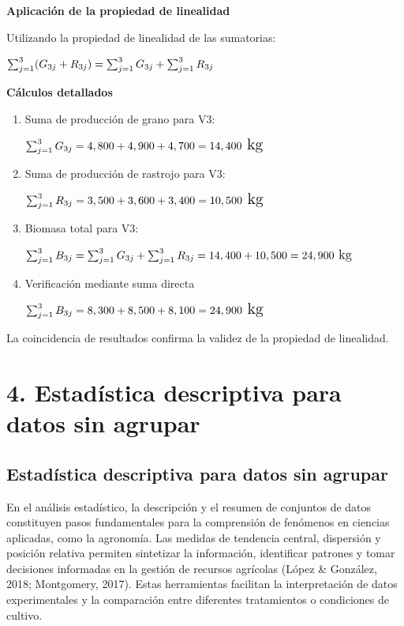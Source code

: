\documentclass[
  spanish,
  letterpaper,
]{book}
\begin{document}
\textbf{Aplicación de la propiedad de linealidad}

Utilizando la propiedad de linealidad de las sumatorias:

\(\Large \sum_{j=1}^{3} (G_{3j} + R_{3j}) = \sum_{j=1}^{3} G_{3j} + \sum_{j=1}^{3} R_{3j}\)

\textbf{Cálculos detallados}

\begin{enumerate}
\def\labelenumi{\arabic{enumi}.}
\item
  Suma de producción de grano para V3:

  \(\Large \sum_{j=1}^{3} G_{3j} = 4,800 + 4,900 + 4,700 = 14,400 \text{ kg}\)
\item
  Suma de producción de rastrojo para V3:

  \(\Large \sum_{j=1}^{3} R_{3j} = 3,500 + 3,600 + 3,400 = 10,500 \text{ kg}\)
\item
  Biomasa total para V3:

  \(\large \sum_{j=1}^{3} B_{3j} = \sum_{j=1}^{3} G_{3j} + \sum_{j=1}^{3} R_{3j} = 14,400 + 10,500 = 24,900 \text{ kg}\)
\item
  Verificación mediante suma directa

  \(\Large \sum_{j=1}^{3} B_{3j} = 8,300 + 8,500 + 8,100 = 24,900 \text{ kg}\)
\end{enumerate}

La coincidencia de resultados confirma la validez de la propiedad de
linealidad.

\part{4. Estadística descriptiva para datos sin agrupar}


\chapter{Estadística descriptiva para datos sin
agrupar}\label{estaduxedstica-descriptiva-para-datos-sin-agrupar-1}

En el análisis estadístico, la descripción y el resumen de conjuntos de
datos constituyen pasos fundamentales para la comprensión de fenómenos
en ciencias aplicadas, como la agronomía. Las medidas de tendencia
central, dispersión y posición relativa permiten sintetizar la
información, identificar patrones y tomar decisiones informadas en la
gestión de recursos agrícolas (López \& González, 2018; Montgomery,
2017). Estas herramientas facilitan la interpretación de datos
experimentales y la comparación entre diferentes tratamientos o
condiciones de cultivo.
\end{document}
